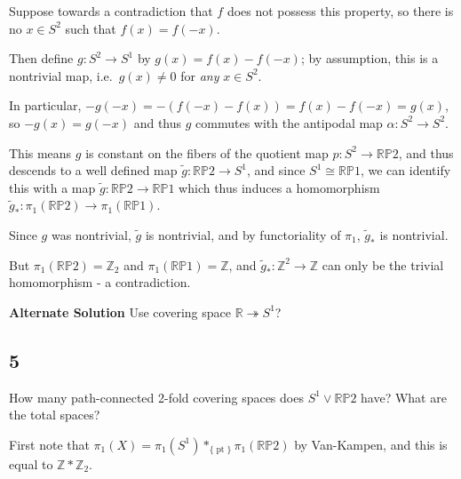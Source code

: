 \begin{solution}

Suppose towards a contradiction that \(f\) does not possess this
property, so there is no \(x\in S^2\) such that \(f(x) = f(-x)\).

Then define \(g: S^2 \to S^1\) by \(g(x) = {f(x) - f(-x)}\); by
assumption, this is a nontrivial map, i.e.~\(g(x) \neq 0\) for
\emph{any} \(x\in S^2\).

In particular, \(-g(-x) = -{(f(-x) - f(x))} = {f(x) - f(-x)} = g(x)\),
so \(-g(x) = g(-x)\) and thus \(g\) commutes with the antipodal map
\(\alpha: S^2 \to S^2\).

This means \(g\) is constant on the fibers of the quotient map
\(p: S^2 \to{\mathbb{RP}}2\), and thus descends to a well defined map
\(\tilde g: {\mathbb{RP}}2 \to S^1\), and since
\(S^1 \cong {\mathbb{RP}}1\), we can identify this with a map
\(\tilde g: {\mathbb{RP}}2 \to{\mathbb{RP}}1\) which thus induces a
homomorphism
\(\tilde g_*: \pi_1({\mathbb{RP}}2) \to \pi_1({\mathbb{RP}}1)\).

Since \(g\) was nontrivial, \(\tilde g\) is nontrivial, and by
functoriality of \(\pi_1\), \(\tilde g_*\) is nontrivial.

But \(\pi_1({\mathbb{RP}}2) = {\mathbb{Z}}_2\) and
\(\pi_1({\mathbb{RP}}1) = {\mathbb{Z}}\), and
\(\tilde g_*: {\mathbb{Z}}^2 \to{\mathbb{Z}}\) can only be the trivial
homomorphism - a contradiction.

\end{solution}

\begin{remark}

\textbf{Alternate Solution} Use covering space
\({\mathbb{R}}\twoheadrightarrow S^1\)?

\end{remark}

\hypertarget{section-18}{%
\subsection{5}\label{section-18}}

How many path-connected 2-fold covering spaces does
\(S^1 \vee {\mathbb{RP}}2\) have? What are the total spaces?

\begin{solution}

First note that
\(\pi_1(X) = \pi_1(S^1) \ast_{{\{\operatorname{pt}\}}} \pi_1({\mathbb{RP}}2)\)
by Van-Kampen, and this is equal to \({\mathbb{Z}}\ast {\mathbb{Z}}_2\).

\end{solution}

